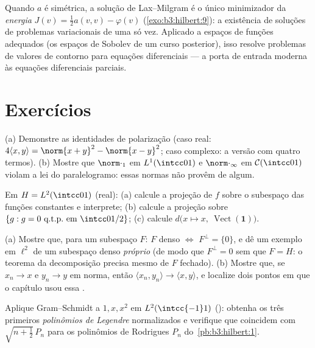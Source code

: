 \begin{remark}\label{rem:b3:hilbert:variational}
Quando $a$ é simétrica, a solução de Lax--Milgram é o único
minimizador da \emph{energia} $J(v) = \frac12a(v,v) -
\varphi(v)$ (\cref{exo:b3:hilbert:9}): a existência de
soluções de problemas variacionais de uma só vez. Aplicado a espaços de
funções adequados (os espaços de Sobolev de um curso posterior), isso
resolve problemas de valores de contorno para equações diferenciais ---
a porta de entrada moderna às equações diferenciais parciais.
\end{remark}

\section{Exercícios}

\begin{exercise}[$\star$]\label{exo:b3:hilbert:1}
(a) Demonstre as identidades de polarização (caso real: $4\langle x,
y\rangle = \norm{x+y}^2 - \norm{x-y}^2$; caso
complexo: a versão com quatro termos).
(b) Mostre que $\norm\cdot_1$ em $L^1(\intcc01)$ e $\norm\cdot_\infty$ em $\mathcal C(\intcc01)$ violam a lei do
paralelogramo: essas normas não provêm de  algum.
\end{exercise}

\begin{exercise}[$\star$]\label{exo:b3:hilbert:2}
Em $H = L^2(\intcc01)$ (real):
(a) calcule a projeção de $f$ sobre o subespaço das funções
constantes e interprete;
(b) calcule a projeção sobre $\{g : g = 0 \text{ q.t.p.\ em }
\intcc0{1/2}\}$;
(c) calcule $d\bigl(x \mapsto x,\ \operatorname{Vect}(\mathbf
1)\bigr)$.
\end{exercise}

\begin{exercise}[$\star\star$]\label{exo:b3:hilbert:3}
(a) Mostre que, para um subespaço $F$: $F$ denso $\iff$
$F^\perp =
\{0\}$, e dê um exemplo em $\ell^2$ de um subespaço denso
\emph{próprio} (de modo que $F^\perp = 0$ sem que $F = H$: o teorema da
decomposição precisa mesmo de $F$ fechado).
(b) Mostre que, se $x_n \to x$ e $y_n \to y$ em norma, então $\langle x_n, y_n\rangle \to \langle x, y\rangle$, e localize dois
pontos em que o capítulo usou essa .
\end{exercise}

\begin{exercise}[$\star\star$]\label{exo:b3:hilbert:4}
Aplique Gram--Schmidt a $1, x, x^2$ em $L^2(\intcc{-1}1)$ (): obtenha os
três primeiros \emph{polinômios de Legendre} normalizados e verifique
que coincidem com $\sqrt{n + \frac12}\,P_n$ para os polinômios de Rodrigues $P_n$
do~\cref{pb:b3:hilbert:1}.
\end{exercise}


